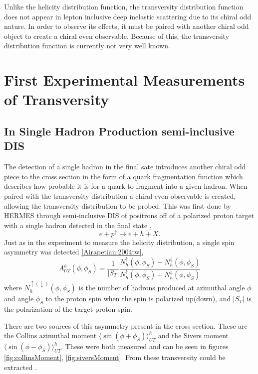\documentclass[abstract = on,listof=totoc, bibliography=totoc]{scrreprt}
\begin{document}
Unlike the helicity distribution function, the transversity distribution function does not appear in lepton inclusive deep inelastic scattering due to its chiral odd nature. In order to observe its effects, it must be paired with another chiral odd object to create a chiral even observable. Because of this, the transversity distribution function is currently not very well known. 

\section{First Experimental Measurements of Transversity}
\subsection{In Single Hadron Production semi-inclusive DIS}
The detection of a single hadron in the final sate introduces another chiral odd piece to the cross section in the form of a quark fragmentation function which describes how probable it is for a quark to fragment into a given hadron. When paired with the transversity distribution a chiral even observable is created, allowing the transversity distribution to be probed. This was first done by HERMES through semi-inclusive DIS of positrons off of a polarized proton target with a single hadron detected in the final state \cite{Airapetian:2004tw, Anselmino:2007fs}, 
\begin{equation}
e+p^\uparrow \rightarrow e + h + X.
\end{equation}
Just as in the experiment to measure the helicity distribution, a single spin asymmetry was detected \ref{Airapetian:2004tw},
\begin{equation}
A^h_{UT}(\phi,\phi_S) = \frac{1}{|S_T|}\frac{N^\uparrow_h(\phi,\phi_S) - N^\downarrow_h(\phi,\phi_S)}{N^\uparrow_h(\phi,\phi_S) + N^\downarrow_h(\phi,\phi_S)}
\end{equation} 
where $N^{\uparrow(\downarrow)}_h(\phi,\phi_S)$ is the number of hadrons produced at azimuthal angle $\phi$ and angle $\phi_S$ to the proton spin when the spin is polarized up(down), and $|S_T|$ is the polarization of the target proton spin. 

There are two sources of this asymmetry present in the cross section. These are the Collins azimuthal moment $\langle\sin(\phi+\phi_S)\rangle_{UT}^h$ and the Sivers moment $\langle\sin(\phi-\phi_S)\rangle_{UT}^h$. These were both measured and can be seen in figures \ref{fig:collinsMoment}, \ref{fig:siversMoment}. From these transversity could be extracted \cite{Anselmino:2007fs}.
\end{document}
